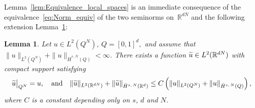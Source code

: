 \documentclass[10pt]{amsart}
\newtheorem{lemm}[theo]{Lemma}\newtheorem{prop}[theo]{Proposition}\newtheorem{coro}[theo]{Corollary}\newtheorem{conj}[theo]{Conjecture}
\theoremstyle{definition}\newtheorem{defi}[theo]{Definition}\newtheorem{rema}[theo]{Remark}\newtheorem{exam}[theo]{Example}\newtheorem{exem}[theo]{Example}\newtheorem{nota}[theo]{Notation}
\newcommand*\R {\mathbb{R}}
\newcommand\1{{\ensuremath {\mathds 1} }}
\let\oldtilde\tilde
\renewcommand*{\tilde}[1]{\mathchoice{\widetilde{#1}}{\widetilde{#1}}{\oldtilde{#1}}{\oldtilde{#1}}}\let\oldhat\hat
\renewcommand*{\hat}[1]{\mathchoice{\widehat{#1}}{\widehat{#1}}{\oldhat{#1}}{\oldhat{#1}}}\let\oldforall\forall
\renewcommand*{\forall}{\mathrel{\oldforall}}
\begin{document}
Lemma~\ref{lem:Equivalence_local_spaces} is an immediate consequence of the equivalence~\eqref{eq:Norm_equiv} of the two seminorms on~$\R^{dN}$ and the following extension Lemma~\ref{lem:Extension_on_cubes}:

\begin{lemm}\label{lem:Extension_on_cubes}
Let $u\in L^2(Q^N)$, $Q=[0, 1]^{d},$ and assume that $\|u\|_{L^2(Q^N)}+\|u\|_{\dot{H}^{s,\,N}(Q)}<\infty$. There exists a function $\tilde u\in L^2(\R^{dN})$ with compact support satisfying
\begin{equation*}
\tilde u\big|_{Q^N}=u,
\quad \text{and} \quad
\|\tilde u\|_{L^2(\R^{dN})}+\|\tilde u\|_{\dot{H}^{s,\,N}(\R^{d})}\leq C \left(\|u\|_{L^2\left(Q^N\right)}+\|u\|_{\dot{H}^{s,\,N}(Q)}\right),
\end{equation*}
where $C$ is a constant depending only on $s$, $d$ and $N$.
\end{lemm}
\end{document}
